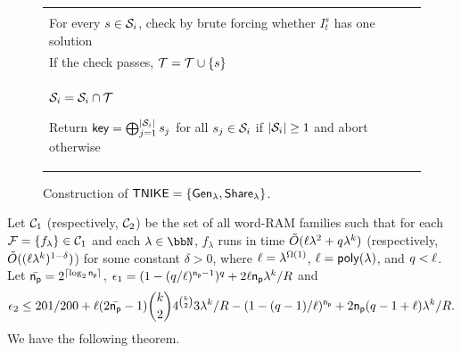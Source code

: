 \begin{figure}[h!]
\begin{center}
{\begin{tabular}{l}
\begin{minipage}[t]{0.7\textwidth}
    \underline{$\share(i,\sk_i,(\pk_j)_{j\in[\pnum]})$:}
    	\item Parse $(\pk_{t}=(\instance^j_t)_{j\in[\listlength]})_{t\in[\pnum]}$, $\sk_i = \set_i$.
    	\item For $t \in [\pnum]\backslash\{i\}$, $\tempset = \emptyset$\\
		\tab For every $s \in \mathcal{S}_i$, check by brute forcing whether $I^{s}_{t}$ has one solution\\
		\tab\tab If the check passes, $\mathcal{T} = \mathcal{T} \cup \{s\}$\\
		\tab $\mathcal{S}_i = \mathcal{S}_i \cap \mathcal{T}$
    	\item Return $\mathsf{key} = \bigoplus_{j=1}^{|\mathcal{S}_{i}|} s_j$ for all $s_j \in \mathcal{S}_i$ if $|\mathcal{S}_i| \geq 1$ and abort otherwise
    \end{minipage} 
      \end{tabular}
      }
\end{center}
\caption{Construction of $\mathsf{TNIKE}=\{{\mathsf{Gen}}_\lambda,{\mathsf{Share}}_\lambda\}$.}
\label{fig:con-time-nike}
\end{figure}

Let $\mathcal{C}_1$ (respectively, $\mathcal{C}_2$) be the set of all word-RAM families such that for each $\mathcal{F} = \{f_{\lambda}\}\in\mathcal{C}_1$ and each $\lambda\in\N$, $f_{\lambda}$ runs in time $\tilde{O}(\ell\lambda^2 + q\lambda^{k})$ (respectively, $\tilde{O}((\ell\lambda^{k})^{1-\delta})$) for some constant $\delta>0$, where $\ell = \lambda^{\Omega(1)}$, $\ell = \mathsf{poly}(\lambda)$, and $q < \ell$. 
Let
$\bar{\mathsf{n_p}}=2^{\lceil\log_2\mathsf{n_p}\rceil}$,
$\epsilon_1= (1- (q/\ell)^{\mathsf{n_p}-1})^{q}+2\ell\mathsf{n_p}\lambda^k/R$
and 
$$
\epsilon_2 \leq 201/200 + \ell(2\bar{\mathsf{n_p}}-1)\binom{k}{2}4^{\binom{k}{2}}3\lambda^k/{R}-(1-(q-1)/\ell)^{\mathsf{n_p}}+2\mathsf{n_p}(q-1+\ell)\lambda^{k}/{R}.
$$
We have the following theorem.


